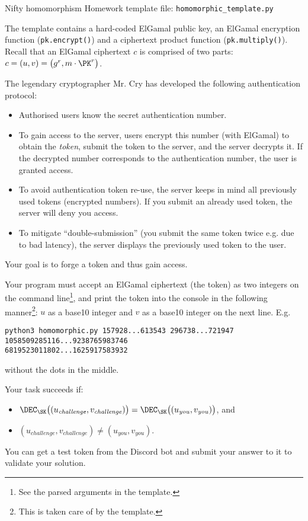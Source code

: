 \documentclass{homework}
\begin{document}
\begin{task}{Nifty homomorphism}
  Homework template file: \texttt{homomorphic\_template.py}

  The template contains a hard-coded ElGamal public key, an ElGamal encryption function (\texttt{pk.encrypt()}) and a ciphertext product function (\texttt{pk.multiply()}).
  Recall that an ElGamal ciphertext $c$ is comprised of two parts: $c = (u, v) = \bigl(g^r, m\cdot\PK^r\bigr)$.

  The legendary cryptographer Mr. Cry has developed the following authentication protocol:
  \begin{itemize}
    \item Authorised users know the secret authentication number.
    \item To gain access to the server, users encrypt this number (with ElGamal) to obtain the \emph{token}, submit the token to the server, and the server decrypts it.
    If the decrypted number corresponds to the authentication number, the user is granted access.
    \item To avoid authentication token re-use, the server keeps in mind all previously used tokens (encrypted numbers).
    If you submit an already used token, the server will deny you access.
    \item To mitigate \enquote{double-submission} (you submit the same token twice e.g. due to bad latency), the server displays the previously used token to the user.
  \end{itemize}

  Your goal is to forge a token and thus gain access.

  Your program must accept an ElGamal ciphertext (the token) as two integers on the command line\footnote{See the parsed arguments in the template.}, and print the token into the console in the following manner\footnote{This is taken care of by the template.}: $u$ as a base10 integer and $v$ as a base10 integer on the next line.
  E.g.
  \begin{Verbatim}
python3 homomorphic.py 157928...613543 296738...721947
1058509285116...9238765983746
6819523011802...1625917583932
  \end{Verbatim}
  without the dots in the middle.
  
  Your task succeeds if:
  \begin{itemize}
    \item $\DEC_\SK\bigl((u_\mathit{challenge}, v_\mathit{challenge})\bigr) = \DEC_\SK\bigl((u_\mathit{you}, v_\mathit{you})\bigr)$, and
    \item $(u_\mathit{challenge}, v_\mathit{challenge}) \neq (u_\mathit{you}, v_\mathit{you})$.
  \end{itemize}

  You can get a test token from the Discord bot and submit your answer to it to validate your solution.
\end{task}
\end{document}
